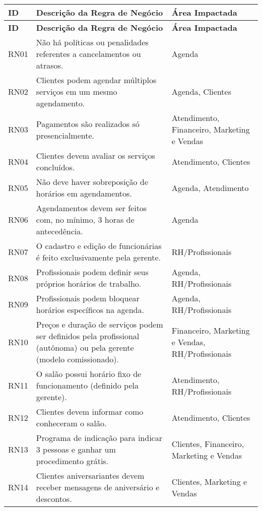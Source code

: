 \begin{longtable}{|p{1.2cm}|p{10cm}|p{4cm}|}
	\hline
	\textbf{ID} & \textbf{Descrição da Regra de Negócio} & \textbf{Área Impactada} \\
	\hline
	\endfirsthead
	
	\hline
	\textbf{ID} & \textbf{Descrição da Regra de Negócio} & \textbf{Área Impactada} \\
	\hline
	\endhead
	
	RN01 & Não há políticas ou penalidades referentes a cancelamentos ou atrasos. & Agenda \\
	\hline
	RN02 & Clientes podem agendar múltiplos serviços em um mesmo agendamento. & Agenda, Clientes \\
	\hline
	RN03 & Pagamentos são realizados só presencialmente. & Atendimento, Financeiro, Marketing e Vendas \\
	\hline
	RN04 & Clientes devem avaliar os serviços concluídos. & Atendimento, Clientes \\
	\hline
	RN05 & Não deve haver sobreposição de horários em agendamentos. & Agenda, Atendimento \\
	\hline
	RN06 & Agendamentos devem ser feitos com, no mínimo, 3 horas de antecedência. & Agenda \\
	\hline
	RN07 & O cadastro e edição de funcionárias é feito exclusivamente pela gerente. & RH/Profissionais \\
	\hline
	RN08 & Profissionais podem definir seus próprios horários de trabalho. & Agenda, RH/Profissionais \\
	\hline
	RN09 & Profissionais podem bloquear horários específicos na agenda. & Agenda, RH/Profissionais \\
	\hline
	RN10 & Preços e duração de serviços podem ser definidos pela profissional (autônoma) ou pela gerente (modelo comissionado). & Financeiro, Marketing e Vendas, RH/Profissionais \\
	\hline
	RN11 & O salão possui horário fixo de funcionamento (definido pela gerente). & Atendimento, RH/Profissionais \\
	\hline
	RN12 & Clientes devem informar como conheceram o salão. & Atendimento, Clientes \\
	\hline
	RN13 & Programa de indicação para indicar 3 pessoas e ganhar um procedimento grátis. & Clientes, Financeiro, Marketing e Vendas \\
	\hline
	RN14 & Clientes aniversariantes devem receber mensagens de aniversário e descontos. & Clientes, Marketing e Vendas \\

\end{longtable}
